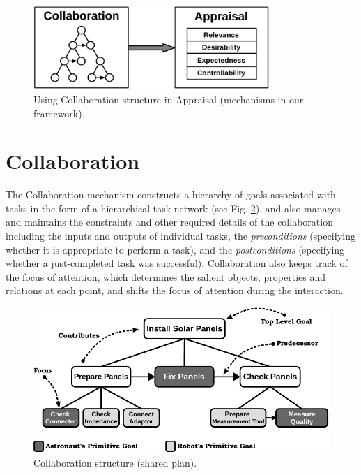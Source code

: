 \documentclass[12pt]{report}
\begin{document}
\begin{figure}[tbh]
  \centering
  \includegraphics[width=0.8\textwidth]{figure/appraisal-collaboration-croped.pdf}
  \caption{{\fontsize{9}{9}\selectfont Using Collaboration structure in
  Appraisal (mechanisms in our framework).}}
  \label{fig:appraisal-collaboration}
\end{figure}

\section{Collaboration}
The Collaboration mechanism constructs a hierarchy of goals associated with
tasks in the form of a hierarchical task network (see Fig. \ref{fig:cs}), and
also manages and maintains the constraints and other required details of the
collaboration including the inputs and outputs of individual tasks, the
\textit{preconditions} (specifying whether it is appropriate to perform a task),
and the \textit{postconditions} (specifying whether a just-completed task was
successful). Collaboration also keeps track of the focus of attention, which
determines the salient objects, properties and relations at each point, and
shifts the focus of attention during the interaction.

\begin{figure}[tbh]
  \centering
  \includegraphics[width=1\textwidth]{figure/collaborationStructure-small-croped.pdf}
  \caption{{\fontsize{9}{9}\selectfont Collaboration structure (shared plan).}}
  \label{fig:cs}
\end{figure}
\end{document}
